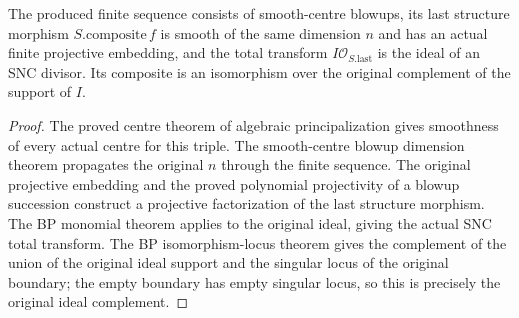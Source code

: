 \begin{theorem}\label{thm:kn-nadel-original-global-principalization}
\leanok
{}
The produced finite sequence consists of smooth-centre blowups, its
last structure morphism $S.\mathrm{composite}\,f$ is smooth of the same
dimension $n$ and has an actual finite projective embedding, and the
total transform $I\mathcal O_{S.\mathrm{last}}$ is the ideal of an SNC
divisor.  Its composite is an isomorphism over the original complement
of the support of $I$.
\end{theorem}
\begin{proof}
The proved centre theorem of algebraic principalization gives smoothness
of every actual centre for this triple.  The smooth-centre blowup
dimension theorem propagates the original $n$ through the finite sequence.
The original projective embedding and the proved polynomial projectivity
of a blowup succession construct a projective factorization of the last
structure morphism.  The BP monomial theorem applies to the original
ideal, giving the actual SNC total transform.  The BP isomorphism-locus
theorem gives the complement of the union of the original ideal support
and the singular locus of the original boundary; the empty boundary has
empty singular locus, so this is precisely the original ideal complement.
\end{proof}


